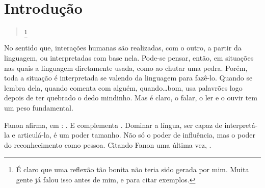 \chapter{Introdução}
\label{cha:introducao}
\begin{quote}
     \cite{oliveira2019servico}
    \footnote{É claro que uma reflexão tão bonita não teria sido gerada por mim. Muita gente já falou isso antes de mim,  e  para citar exemplos.}
\end{quote}
No sentido que, interações humanas são realizadas, com o outro, a partir da linguagem, ou interpretadas com base nela. 
Pode-se pensar, então, em situações nas quais a linguagem  diretamente usada, como ao chutar uma pedra.
Porém, toda a situação é interpretada se valendo da linguagem para fazê-lo. 
Quando se lembra dela, quando comenta com alguém, quando\ldots bom, usa palavrões logo depois de ter quebrado o dedo mindinho. Mas é claro, o falar, o ler e o ouvir tem um peso fundamental.

Fanon afirma, em : . E complementa  . Dominar a língua, ser capaz de interpretá-la e articulá-la, é um poder tamanho. Não só o poder de influência, mas o poder do reconhecimento como pessoa. Citando Fanon uma última vez,  .


